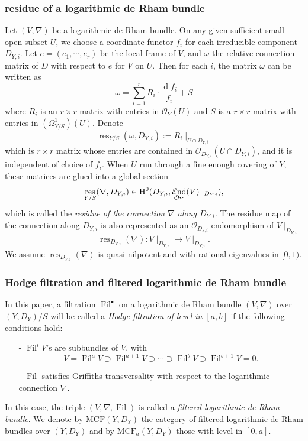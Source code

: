 \documentclass[12pt,twoside]{book}
\theoremstyle{plain}
\theoremstyle{definition}
\theoremstyle{remark}
\newcommand{\mO}{{\mathcal O}}
\DeclareMathOperator\rmd{d}
\DeclareMathOperator\mEnd{\mathcal End}
\DeclareMathOperator\Fil{Fil}
\DeclareMathOperator\res{res}
\newcommand{\MCF}{\mathrm{MCF}}
\numberwithin{equation}{section}
\begin{document}
\subsubsection{residue of a logarithmic de Rham bundle} Let $(V,\nabla)$ be a logarithmic de Rham bundle. On any given sufficient small open subset $U$, we choose a coordinate functor $f_i$ for each irreducible component $D_{Y,i}$. Let $e=(e_1,\cdots,e_r)$ be the local frame of $V$, and $\omega$ the relative connection matrix of $D$ with respect to $e$ for $V$ on $U$. Then for each $i$, the matrix $\omega$ can be written as
\[\omega = \sum_{i=1}^{r} R_i \cdot \frac{\rmd f_i}{f_i} + S\]
where $R_i$ is an $r\times r$ matrix with entries in $\mO_Y(U)$ and $S$ is a $r\times r$ matrix with entries in $(\Omega_{Y/S}^1)(U)$. Denote
\[\res_{Y/S}(\omega,D_{Y,i}) := R_i\mid_{U\cap D_{Y,i}}\]
which is $r\times r$ matrix whose entries are contained in $\mO_{D_{Y,i}}(U\cap D_{Y,i})$, and it is independent of choice of $f_i$. When $U$ run through a fine enough covering of $Y$, these matrices are glued into a global section
\[\emph{$\res_{Y/S}(\nabla,D_{Y,i})$} \in \mathrm{H}^0(D_{Y,i},\mEnd_{\mathcal O_Y}(V)\mid_{D_{Y,i}}),\]
which is called the \emph{residue of the connection $\nabla$ along $D_{Y,i}$}. The residue map of the connection along $D_{Y,i}$ is also represented as an $\mO_{D_{Y,i}}$-endomorphism of $V\mid_{D_{Y,i}}$
\[\res_{D_{Y,i}}(\nabla)\colon V\mid_{D_{Y,i}}\longrightarrow V\mid_{D_{Y,i}}.\]
We assume $\res_{D_{Y,i}}(\nabla)$ is quasi-nilpotent and with rational eigenvalues in $[0,1)$.

\subsubsection{Hodge filtration and filtered logarithmic de Rham bundle}
In this paper, a filtration $\Fil^\bullet$ on a logarithmic de Rham bundle $(V,\nabla)$ over $(Y,D_Y)/S$ will be called a \emph{Hodge filtration of level in $[a,b]$} if the following conditions hold:
\begin{itemize}
\item[-] $\Fil^i V$'s are subbundles of $V$, with
\[V=\Fil^aV\supset \Fil^{a+1}V \supset\cdots \supset \Fil^bV\supset \Fil^{b+1}V=0.\]
\item[-] $\Fil$ satisfies Griffiths transversality with respect to the logarithmic connection $\nabla$.
\end{itemize}
In this case, the triple $(V,\nabla,\Fil)$ is called a \emph{filtered logarithmic de Rham bundle}. We denote by \emph{$\MCF(Y,D_Y)$} the category of filtered logarithmic de Rham bundles over $(Y,D_Y)$ and by \emph{$\MCF_a(Y,D_Y)$} those with level in $[0,a]$.
\end{document}
